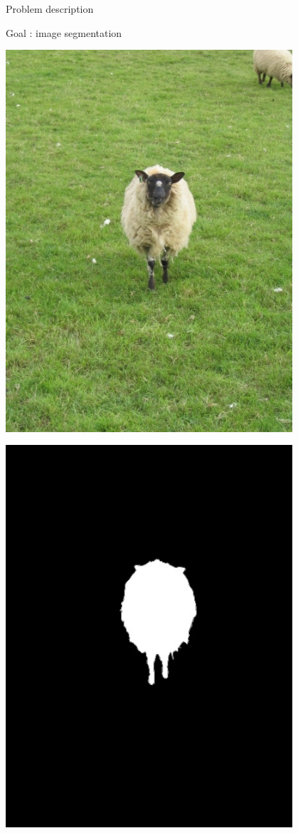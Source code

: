 \documentclass[10pt]{beamer}
\begin{document}
\begin{frame}{Problem description}
\centering
\begin{center}
    Goal : image segmentation
\end{center}
\vspace{0.5cm}
    \begin{minipage}{.5\textwidth}
        \centering
        \includegraphics[width=0.8\textwidth]{input.jpg}
    \end{minipage}%
    \begin{minipage}{0.5\textwidth}
        \centering
        \includegraphics[width=0.8\textwidth]{output.jpg}
    \end{minipage}
\end{frame}
\end{document}
